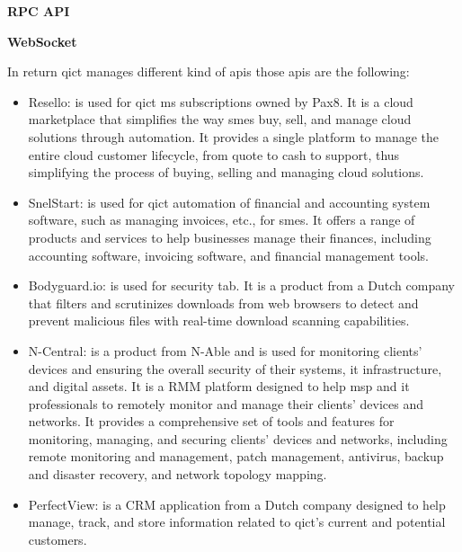       \begin{multicols}{2}
      \textbf{RPC API} %

      \textbf{WebSocket}
      
      In return \acrshort{qict} manages different kind of apis those \acrshort{api}s are the following:
      \begin{itemize}
            \item Resello: is used for \acrshort{qict} \acrshort{ms} subscriptions owned by Pax8. It is a cloud
                  marketplace that simplifies the way \acrshort{sme}s buy, sell, and manage cloud solutions through
                  automation. It provides a single platform to manage the entire cloud customer lifecycle, from
                  quote to cash to support, thus simplifying the process of buying, selling and managing cloud
                  solutions.
            \item SnelStart: is used for \acrshort{qict} automation of financial and accounting system software,
                  such as managing invoices, etc., for \acrshort{sme}s. It offers a range of products and services
                  to help businesses manage their finances, including accounting software, invoicing software, and
                  financial management tools.
            \item Bodyguard.io: is used for security tab. It is a product from a Dutch company that filters and
                  scrutinizes downloads from web browsers to detect and prevent malicious files with real-time
                  download scanning capabilities.
            \item N-Central: is a product from N-Able and is used for monitoring clients' devices and ensuring the
                  overall security of their systems, \acrshort{it} infrastructure, and digital assets. It is a
                  \gls{RMM} platform designed to help \acrshort{msp} and \acrshort{it} professionals to
                  remotely monitor and manage their clients' devices and networks. It provides a comprehensive
                  set of tools and features for monitoring, managing, and securing clients' devices and networks,
                  including remote monitoring and management, patch management, antivirus, backup and disaster
                  recovery, and network topology mapping.
            \item PerfectView: is a \gls{CRM} application from a Dutch company designed to help manage, track, and
                  store information related to \acrshort{qict}'s current and potential customers.
      \end{itemize}

\end{multicols}
